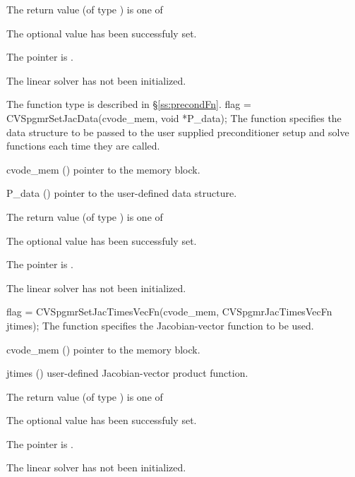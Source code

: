 {
  The return value  (of type ) is one of
  \begin{args}
  \item[\Id{SUCCESS}] 
    The optional value has been successfuly set.
  \item[\Id{LIN\_NO\_MEM}]
    The  pointer is .
  \item[\Id{LIN\_NO\_LMEM}]
    The {\cvspgmr} linear solver has not been initialized.
  \end{args}
}
{
   The function type  is described in \S\ref{ss:precondFn}.
}
{
  flag = CVSpgmrSetJacData(cvode\_mem, void *P\_data);
}
{
  The function  specifies the data structure
  to be passed to the user supplied preconditioner setup and solve
  functions each time they are called.
}
{
  \begin{args}
  \item[cvode\_mem] ()
    pointer to the {\cvodes} memory block.
  \item[P\_data] ()
     pointer to the user-defined data structure.
  \end{args}
}
{
  The return value  (of type ) is one of
  \begin{args}
  \item[\Id{SUCCESS}] 
    The optional value has been successfuly set.
  \item[\Id{LIN\_NO\_MEM}]
    The  pointer is .
  \item[\Id{LIN\_NO\_LMEM}]
    The {\cvspgmr} linear solver has not been initialized.
  \end{args}
}
{}
{
  flag = CVSpgmrSetJacTimesVecFn(cvode\_mem, CVSpgmrJacTimesVecFn jtimes);
}
{
  The function  specifies the Jacobian-vector 
  function to be used.
}
{
  \begin{args}
  \item[cvode\_mem] ()
    pointer to the {\cvodes} memory block.
  \item[jtimes] ()
    user-defined Jacobian-vector product function.
  \end{args}
}
{
  The return value  (of type ) is one of
  \begin{args}
  \item[\Id{SUCCESS}] 
    The optional value has been successfuly set.
  \item[\Id{LIN\_NO\_MEM}]
    The  pointer is .
  \item[\Id{LIN\_NO\_LMEM}]
    The {\cvspgmr} linear solver has not been initialized.
  \end{args}
}

